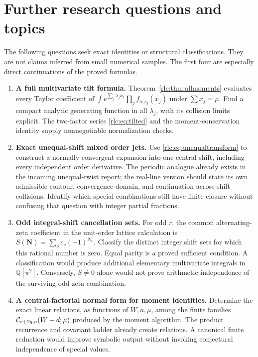 \section{Further research questions and topics}
\label{rlc:sec:research}

The following questions seek exact identities or structural
classifications. They are not claims inferred from small numerical
samples. The first four are especially direct continuations of the
proved formulas.

\begin{enumerate}[label=\textbf{Q\arabic*.},leftmargin=2.8em,itemsep=8pt]
\item \textbf{A full multivariate tilt formula.}
Theorem~\ref{rlc:thm:allmoments} evaluates every Taylor coefficient of
$\int e^{\sum_j\lambda_jx_j}\prod_jf_{a,s_j}(x_j)$ under
$\sum x_j=\mu$. Find a compact analytic generating function in all
$\lambda_j$, with its collision limits explicit. The two-factor
series \eqref{rlc:eq:tilted} and the moment-conservation identity supply
nonnegotiable normalization checks.

\item \textbf{Exact unequal-shift mixed order jets.}
Use \eqref{rlc:eq:unequaltransform} to construct a normally convergent
expansion into one central shift, including every independent order
derivative. The periodic analogue already exists in the incoming
unequal-twist report; the real-line version should state its own
admissible contour, convergence domain, and continuation across shift
collisions. Identify which special combinations still have finite
closure without confusing that question with integer partial fractions.

\item \textbf{Odd integral-shift cancellation sets.}
For odd $r$, the common alternating-zeta coefficient in the unit-order
lattice calculation is
$S(\boldsymbol N)=\sum_\nu c_\nu(-1)^{N_\nu}$.
Classify the distinct integer shift sets for which this rational number
is zero. Equal parity is a proved sufficient condition. A classification
would produce additional elementary multivariate integrals in
$\mathbb Q[\pi^2]$. Conversely, $S\ne0$ alone would not prove arithmetic
independence of the surviving odd-zeta combination.

\item \textbf{A central-factorial normal form for moment identities.}
Determine the exact linear relations, as functions of $W,a,\mu$, among
the finite families $\mathcal C_{r+2q,a}(W+d;\mu)$ produced by the moment
algorithm. The product recurrence and covariant ladder already create
relations. A canonical finite reduction would improve symbolic output
without invoking conjectural independence of special values.


\end{enumerate}
